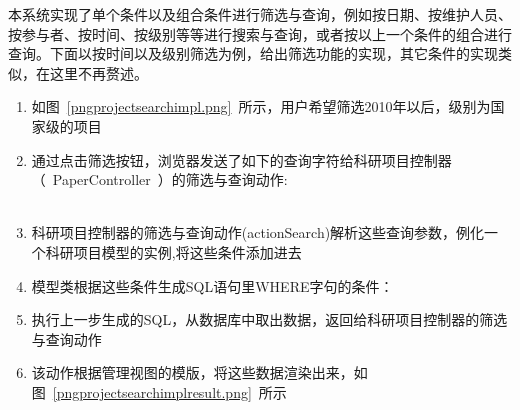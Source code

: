 本系统实现了单个条件以及组合条件进行筛选与查询，例如按日期、按维护人员、按参与者、按时间、按级别等等进行搜索与查询，或者按以上一个条件的组合进行查询。下面以按时间以及级别筛选为例，给出筛选功能的实现，其它条件的实现类似，在这里不再赘述。

\begin{enumerate}
\item 如图~\ref{pngprojectsearchimpl.png}~所示，用户希望筛选2010年以后，级别为国家级的项目
\item 通过点击筛选按钮，浏览器发送了如下的查询字符给科研项目控制器（~PaperController~）的筛选与查询动作:\\
\noindent
\ttfamily
{}\hlkwa{$>$}\hlstd{}\hlstd{{-}}\hlstd{{-}}\hspace*{\fill}\\
\hlstd{}\hspace*{\fill}
\mbox{}
\normalfont
\normalsize
\item 科研项目控制器的筛选与查询动作(actionSearch)解析这些查询参数，例化一个科研项目模型的实例,将这些条件添加进去
\item 模型类根据这些条件生成SQL语句里WHERE字句的条件：\\
\noindent
\ttfamily
{}\hlkwa{$>$}\hlstd{{-}}\hlstd{{-}}\hspace*{\fill}
\mbox{}
\normalfont
\normalsize
\item 执行上一步生成的SQL，从数据库中取出数据，返回给科研项目控制器的筛选与查询动作
\item 该动作根据管理视图的模版，将这些数据渲染出来，如图~\ref{pngprojectsearchimplresult.png}~所示
\end{enumerate} 

